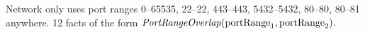 Network only uses port ranges 0--65535, 22--22, 443--443, 5432--5432, 80--80, 80--81 anywhere. 12 facts of the form $\mathit{PortRangeOverlap}(\mathrm{portRange}_1,\mathrm{portRange}_2).$

